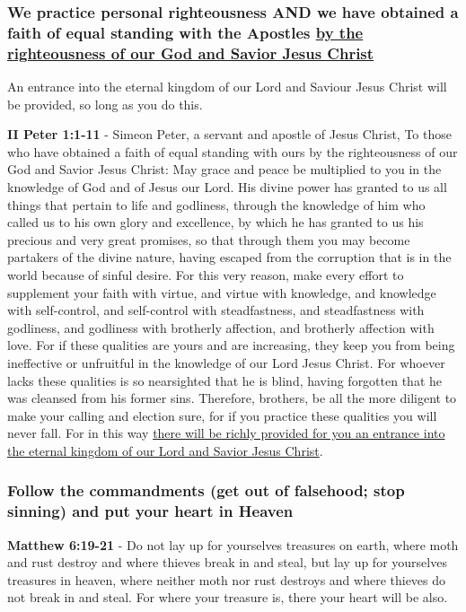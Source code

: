 \documentclass[11pt]{article}
\begin{document}
\subsubsection{We practice personal righteousness AND we have obtained a faith of equal standing with the Apostles \underline{by the righteousness of our God and Savior Jesus Christ}}
\label{sec:org23429aa}
An entrance into the eternal kingdom of our Lord and Saviour Jesus Christ will
be provided, so long as you do this.

\textbf{II Peter 1:1-11} - Simeon Peter, a servant and apostle of Jesus Christ, To those who have obtained a faith of equal standing with ours by the righteousness of our God and Savior Jesus Christ: May grace and peace be multiplied to you in the knowledge of God and of Jesus our Lord.  His divine power has granted to us all things that pertain to life and godliness, through the knowledge of him who called us to his own glory and excellence, by which he has granted to us his precious and very great promises, so that through them you may become partakers of the divine nature, having escaped from the corruption that is in the world because of sinful desire.  For this very reason, make every effort to supplement your faith with virtue, and virtue with knowledge, and knowledge with self-control, and self-control with steadfastness, and steadfastness with godliness, and godliness with brotherly affection, and brotherly affection with love.  For if these qualities are yours and are increasing, they keep you from being ineffective or unfruitful in the knowledge of our Lord Jesus Christ.  For whoever lacks these qualities is so nearsighted that he is blind, having forgotten that he was cleansed from his former sins.  Therefore, brothers, be all the more diligent to make your calling and election sure, for if you practice these qualities you will never fall.  For in this way \uline{there will be richly provided for you an entrance into the eternal kingdom of our Lord and Savior Jesus Christ}.

\subsubsection{Follow the commandments (get out of falsehood; stop sinning) and put your heart in Heaven}
\label{sec:orgb91e01c}
\textbf{Matthew 6:19-21} - Do not lay up for yourselves treasures on earth, where moth and rust destroy and where thieves break in and steal, but lay up for yourselves treasures in heaven, where neither moth nor rust destroys and where thieves do not break in and steal. For where your treasure is, there your heart will be also.
\end{document}
